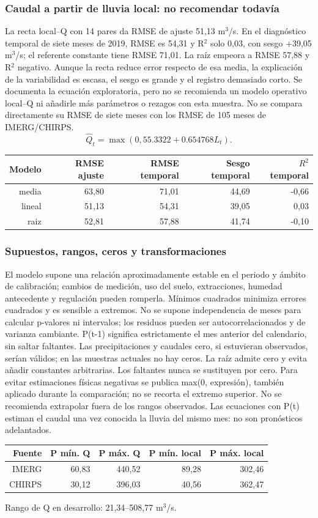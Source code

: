 \subsubsection*{Caudal a partir de lluvia local: no recomendar todavía}
La recta local--Q con 14 pares da RMSE de ajuste 51,13 m$^3$/s. En el diagnóstico temporal de siete meses de 2019, RMSE es 54,31 y R$^2$ solo 0,03, con sesgo +39,05 m$^3$/s; el referente constante tiene RMSE 71,01. La raíz empeora a RMSE 57,88 y R$^2$ negativo. Aunque la recta reduce error respecto de esa media, la explicación de la variabilidad es escasa, el sesgo es grande y el registro demasiado corto. Se documenta la ecuación exploratoria, pero no se recomienda un modelo operativo local--Q ni añadirle más parámetros o rezagos con esta muestra. No se compara directamente su RMSE de siete meses con los RMSE de 105 meses de IMERG/CHIRPS.
\[\widehat{Q}_t=\max\left(0,55.3322+0.654768L_t\right).\]
\begin{center}\small\begin{tabular}{rrrrr}\hline
Modelo & RMSE ajuste & RMSE temporal & Sesgo temporal & $R^2$ temporal \\ \hline
media & 63,80 & 71,01 & 44,69 & -0,66 \\
lineal & 51,13 & 54,31 & 39,05 & 0,03 \\
raiz & 52,81 & 57,88 & 41,74 & -0,10 \\
\hline\end{tabular}\end{center}
\subsubsection*{Supuestos, rangos, ceros y transformaciones}
El modelo supone una relación aproximadamente estable en el periodo y ámbito de calibración; cambios de medición, uso del suelo, extracciones, humedad antecedente y regulación pueden romperla. Mínimos cuadrados minimiza errores cuadrados y es sensible a extremos. No se supone independencia de meses para calcular p-valores ni intervalos; los residuos pueden ser autocorrelacionados y de varianza cambiante. P(t-1) significa estrictamente el mes anterior del calendario, sin saltar faltantes. Las precipitaciones y caudales cero, si estuvieran observados, serían válidos; en las muestras actuales no hay ceros. La raíz admite cero y evita añadir constantes arbitrarias. Los faltantes nunca se sustituyen por cero. Para evitar estimaciones físicas negativas se publica max(0, expresión), también aplicado durante la comparación; no se recorta el extremo superior. No se recomienda extrapolar fuera de los rangos observados. Las ecuaciones con P(t) estiman el caudal una vez conocida la lluvia del mismo mes: no son pronósticos adelantados.
\begin{center}\small\begin{tabular}{rrrrr}\hline
Fuente & P mín. Q & P máx. Q & P mín. local & P máx. local \\ \hline
IMERG & 60,83 & 440,52 & 89,28 & 302,46 \\
CHIRPS & 30,12 & 396,03 & 40,56 & 362,47 \\
\hline\end{tabular}\end{center}
Rango de Q en desarrollo: 21,34--508,77 m$^3$/s.
